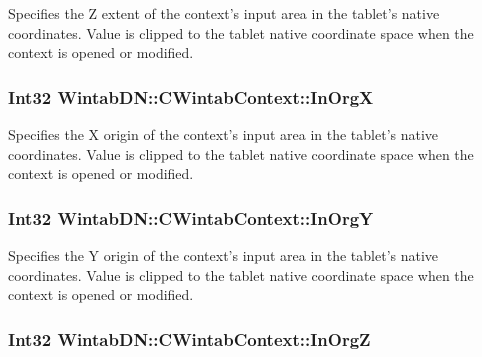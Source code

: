 Specifies the Z extent of the context's input area in the tablet's native coordinates. Value is clipped to the tablet native coordinate space when the context is opened or modified. 

\hypertarget{class_wintab_d_n_1_1_c_wintab_context_a29428a202facd739a6752b7dbd1ef9c2}{
\subsubsection[{InOrgX}]{\setlength{\rightskip}{0pt plus 5cm}Int32 WintabDN::CWintabContext::InOrgX}}
\label{class_wintab_d_n_1_1_c_wintab_context_a29428a202facd739a6752b7dbd1ef9c2}


Specifies the X origin of the context's input area in the tablet's native coordinates. Value is clipped to the tablet native coordinate space when the context is opened or modified. 

\hypertarget{class_wintab_d_n_1_1_c_wintab_context_ac8a0697447e7560bae747c396f27e73f}{
\subsubsection[{InOrgY}]{\setlength{\rightskip}{0pt plus 5cm}Int32 WintabDN::CWintabContext::InOrgY}}
\label{class_wintab_d_n_1_1_c_wintab_context_ac8a0697447e7560bae747c396f27e73f}


Specifies the Y origin of the context's input area in the tablet's native coordinates. Value is clipped to the tablet native coordinate space when the context is opened or modified. 

\hypertarget{class_wintab_d_n_1_1_c_wintab_context_a8ea45c9e123a684c7fc6141f9709a03d}{
\subsubsection[{InOrgZ}]{\setlength{\rightskip}{0pt plus 5cm}Int32 WintabDN::CWintabContext::InOrgZ}}
\label{class_wintab_d_n_1_1_c_wintab_context_a8ea45c9e123a684c7fc6141f9709a03d}


